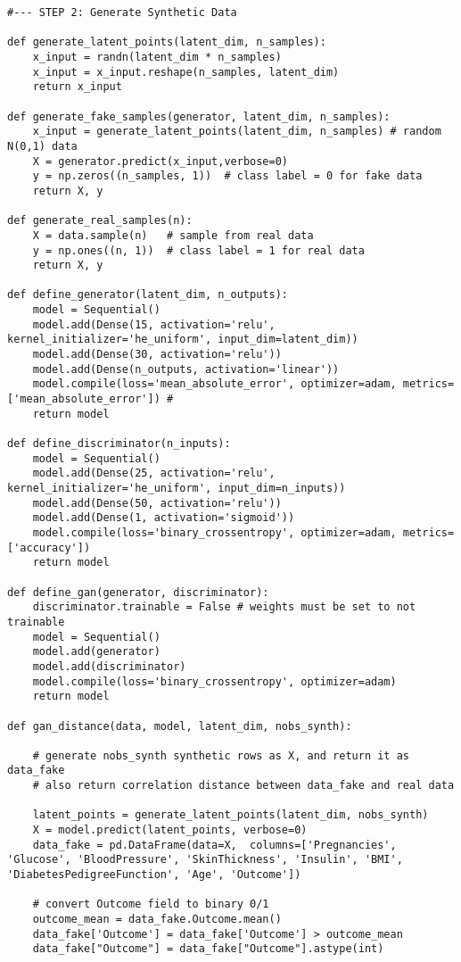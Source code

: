 \documentclass[oneside,10pt]{book}
\begin{document}
\begin{lstlisting}
#--- STEP 2: Generate Synthetic Data

def generate_latent_points(latent_dim, n_samples):
    x_input = randn(latent_dim * n_samples) 
    x_input = x_input.reshape(n_samples, latent_dim)
    return x_input

def generate_fake_samples(generator, latent_dim, n_samples):
    x_input = generate_latent_points(latent_dim, n_samples) # random N(0,1) data
    X = generator.predict(x_input,verbose=0) 
    y = np.zeros((n_samples, 1))  # class label = 0 for fake data
    return X, y

def generate_real_samples(n):
    X = data.sample(n)   # sample from real data
    y = np.ones((n, 1))  # class label = 1 for real data
    return X, y

def define_generator(latent_dim, n_outputs): 
    model = Sequential()
    model.add(Dense(15, activation='relu',  kernel_initializer='he_uniform', input_dim=latent_dim))
    model.add(Dense(30, activation='relu'))
    model.add(Dense(n_outputs, activation='linear'))
    model.compile(loss='mean_absolute_error', optimizer=adam, metrics=['mean_absolute_error']) # 
    return model

def define_discriminator(n_inputs):
    model = Sequential()
    model.add(Dense(25, activation='relu', kernel_initializer='he_uniform', input_dim=n_inputs))
    model.add(Dense(50, activation='relu'))
    model.add(Dense(1, activation='sigmoid'))
    model.compile(loss='binary_crossentropy', optimizer=adam, metrics=['accuracy']) 
    return model

def define_gan(generator, discriminator):
    discriminator.trainable = False # weights must be set to not trainable
    model = Sequential()
    model.add(generator) 
    model.add(discriminator) 
    model.compile(loss='binary_crossentropy', optimizer=adam)  
    return model

def gan_distance(data, model, latent_dim, nobs_synth): 

    # generate nobs_synth synthetic rows as X, and return it as data_fake
    # also return correlation distance between data_fake and real data

    latent_points = generate_latent_points(latent_dim, nobs_synth)  
    X = model.predict(latent_points, verbose=0)  
    data_fake = pd.DataFrame(data=X,  columns=['Pregnancies', 'Glucose', 'BloodPressure', 'SkinThickness', 'Insulin', 'BMI', 'DiabetesPedigreeFunction', 'Age', 'Outcome'])
 
    # convert Outcome field to binary 0/1
    outcome_mean = data_fake.Outcome.mean()
    data_fake['Outcome'] = data_fake['Outcome'] > outcome_mean
    data_fake["Outcome"] = data_fake["Outcome"].astype(int)


\end{lstlisting}
\end{document}
